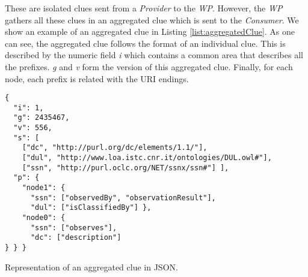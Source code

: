 These are isolated clues sent from a \emph{Provider} to the \emph{WP}.
However, the \emph{WP} gathers all these clues in an aggregated clue which is sent to the \emph{Consumer}.
We show an example of an aggregated clue in Listing \ref{list:aggregatedClue}.
As one can see, the aggregated clue follows the format of an individual clue.
This is described by the numeric field \emph{i} which contains a common area that describes all the prefixes.
\emph{g} and \emph{v} form the version of this aggregated clue.
Finally, for each node, each prefix is related with the URI endings.

\begin{listing}
\begin{verbatim}
{
  "i": 1,
  "g": 2435467,
  "v": 556,
  "s": [
	["dc", "http://purl.org/dc/elements/1.1/"],
	["dul", "http://www.loa.istc.cnr.it/ontologies/DUL.owl#"],
	["ssn", "http://purl.oclc.org/NET/ssnx/ssn#"] ],
  "p": {
    "node1": {
      "ssn": ["observedBy", "observationResult"],
      "dul": ["isClassifiedBy"] },
    "node0": {
      "ssn": ["observes"],
      "dc": ["description"]
} } }
\end{verbatim}
\caption{Representation of an aggregated clue in JSON.}
\label{list:aggregatedClue}
\end{listing}

